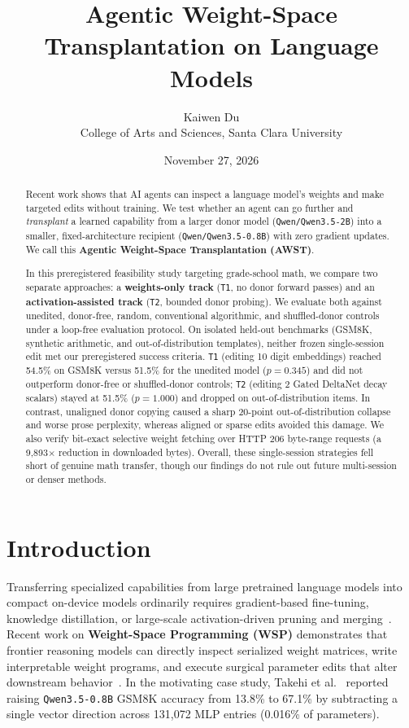 \documentclass[11pt]{article}
\title{\textbf{Agentic Weight-Space Transplantation on Language Models}}
\author{
Kaiwen Du\\
College of Arts and Sciences, Santa Clara University
}
\date{November 27, 2026}
\begin{document}
\maketitle

\begin{abstract}
Recent work shows that AI agents can inspect a language model's weights and make targeted edits without training. We test whether an agent can go further and \emph{transplant} a learned capability from a larger donor model (\texttt{Qwen/Qwen3.5-2B}) into a smaller, fixed-architecture recipient (\texttt{Qwen/Qwen3.5-0.8B}) with zero gradient updates. We call this \textbf{Agentic Weight-Space Transplantation (AWST)}.

In this preregistered feasibility study targeting grade-school math, we compare two separate approaches: a \textbf{weights-only track} (\texttt{T1}, no donor forward passes) and an \textbf{activation-assisted track} (\texttt{T2}, bounded donor probing). We evaluate both against unedited, donor-free, random, conventional algorithmic, and shuffled-donor controls under a loop-free evaluation protocol. On isolated held-out benchmarks (GSM8K, synthetic arithmetic, and out-of-distribution templates), neither frozen single-session edit met our preregistered success criteria. \texttt{T1} (editing 10 digit embeddings) reached 54.5\% on GSM8K versus 51.5\% for the unedited model ($p = 0.345$) and did not outperform donor-free or shuffled-donor controls; \texttt{T2} (editing 2 Gated DeltaNet decay scalars) stayed at 51.5\% ($p = 1.000$) and dropped on out-of-distribution items. In contrast, unaligned donor copying caused a sharp 20-point out-of-distribution collapse and worse prose perplexity, whereas aligned or sparse edits avoided this damage. We also verify bit-exact selective weight fetching over HTTP 206 byte-range requests (a 9,893$\times$ reduction in downloaded bytes). Overall, these single-session strategies fell short of genuine math transfer, though our findings do not rule out future multi-session or denser methods.
\end{abstract}

\section{Introduction}

Transferring specialized capabilities from large pretrained language models into compact on-device models ordinarily requires gradient-based fine-tuning, knowledge distillation, or large-scale activation-driven pruning and merging~\cite{fan2026apm,cui2026transport}. Recent work on \textbf{Weight-Space Programming (WSP)} demonstrates that frontier reasoning models can directly inspect serialized weight matrices, write interpretable weight programs, and execute surgical parameter edits that alter downstream behavior~\cite{takehi2026sparks,li2026weightcode}. In the motivating case study, Takehi et al.~\cite{takehi2026sparks} reported raising \texttt{Qwen3.5-0.8B} GSM8K accuracy from 13.8\% to 67.1\% by subtracting a single vector direction across 131,072 MLP entries (0.016\% of parameters).
\end{document}
